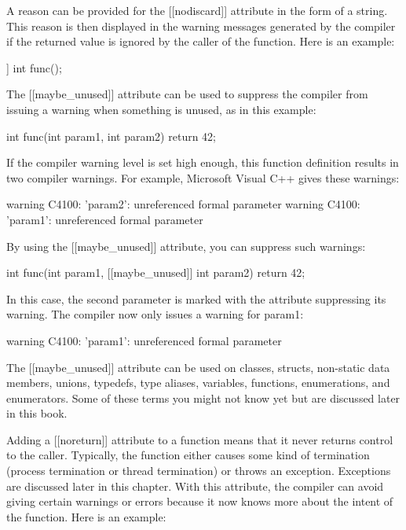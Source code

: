 A reason can be provided for the [[nodiscard]] attribute in the form of a string. This reason is then displayed in the warning messages generated by the compiler if the returned value is ignored by the caller of the function. Here is an example:

\begin{cpp}
[[nodiscard("Some explanation")]] int func();
\end{cpp}


The [[maybe\_unused]] attribute can be used to suppress the compiler from issuing a warning when something is unused, as in this example:

\begin{cpp}
int func(int param1, int param2)
{
    return 42;
}
\end{cpp}

If the compiler warning level is set high enough, this function definition results in two compiler warnings. For example, Microsoft Visual C++ gives these warnings:

\begin{shell}
warning C4100: 'param2': unreferenced formal parameter
warning C4100: 'param1': unreferenced formal parameter
\end{shell}

By using the [[maybe\_unused]] attribute, you can suppress such warnings:

\begin{cpp}
int func(int param1, [[maybe_unused]] int param2)
{
    return 42;
}
\end{cpp}

In this case, the second parameter is marked with the attribute suppressing its warning. The compiler now only issues a warning for param1:

\begin{shell}
warning C4100: 'param1': unreferenced formal parameter
\end{shell}

The [[maybe\_unused]] attribute can be used on classes, structs, non-static data members, unions, typedefs, type aliases, variables, functions, enumerations, and enumerators. Some of these terms you might not know yet but are discussed later in this book.

\mySamllsection{[[noreturn]]}

Adding a [[noreturn]] attribute to a function means that it never returns control to the caller. Typically, the function either causes some kind of termination (process termination or thread termination) or throws an exception. Exceptions are discussed later in this chapter. With this attribute, the compiler can avoid giving certain warnings or errors because it now knows more about the intent of the function. Here is an example:

